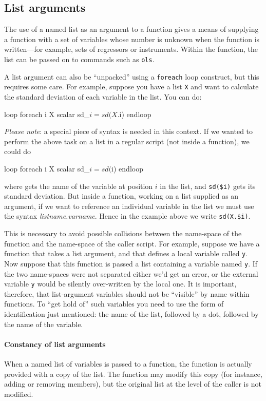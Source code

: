 \subsection{List arguments}

The use of a named list as an argument to a function gives a means of
supplying a function with a set of variables whose number is unknown
when the function is written---for example, sets of regressors or
instruments.  Within the function, the list can be passed on to
commands such as \texttt{ols}.

A list argument can also be ``unpacked'' using a \texttt{foreach} loop
construct, but this requires some care.  For example, suppose you have
a list \texttt{X} and want to calculate the standard deviation of each
variable in the list.  You can do:
%
\begin{code}
loop foreach i X
   scalar sd_$i = sd(X.$i)
endloop
\end{code}

\textit{Please note}: a special piece of syntax is needed in this
context.  If we wanted to perform the above task on a list in a
regular script (not inside a function), we could do
%
\begin{code}
loop foreach i X
   scalar sd_$i = sd($i)
endloop
\end{code}
%
where  gets the name of the variable at position $i$ in the
list, and \verb|sd($i)| gets its standard deviation.  But inside a
function, working on a list supplied as an argument, if we want to
reference an individual variable in the list we must use the syntax
\textsl{listname.varname}.  Hence in the example above we write
\verb|sd(X.$i)|.

This is necessary to avoid possible collisions between the name-space
of the function and the name-space of the caller script.  For example,
suppose we have a function that takes a list argument, and that
defines a local variable called \texttt{y}.  Now suppose that this
function is passed a list containing a variable named \texttt{y}.  If
the two name-spaces were not separated either we'd get an error, or
the external variable \texttt{y} would be silently over-written by the
local one.  It is important, therefore, that list-argument variables
should not be ``visible'' by name within functions.  To ``get hold
of'' such variables you need to use the form of identification just
mentioned: the name of the list, followed by a dot, followed by the
name of the variable.

\paragraph{Constancy of list arguments} When a named list of
variables is passed to a function, the function is actually provided
with a copy of the list.  The function may modify this copy (for
instance, adding or removing members), but the original list at the
level of the caller is not modified.

